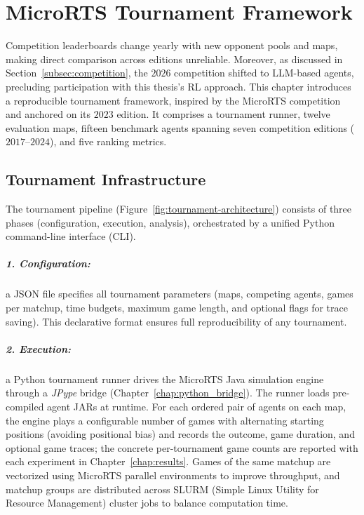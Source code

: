 \chapter{MicroRTS Tournament Framework}
\label{chap:evaluation-framework}

Competition leaderboards change yearly with new opponent pools and maps, making direct comparison across editions unreliable. Moreover, as discussed in Section~\ref{subsec:competition}, the $2026$ competition shifted to LLM-based agents, precluding participation with this thesis's RL approach. This chapter introduces a reproducible tournament framework, inspired by the MicroRTS competition and anchored on its $2023$ edition. It comprises a tournament runner, twelve evaluation maps, fifteen benchmark agents spanning seven competition editions ($2017$--$2024$), and five ranking metrics.

\section{Tournament Infrastructure}
\label{sec:tournament-infrastructure}

The tournament pipeline (Figure~\ref{fig:tournament-architecture}) consists of three phases (configuration, execution, analysis), orchestrated by a unified Python command-line interface (CLI).

\paragraph*{1. Configuration:} a JSON file specifies all tournament parameters (maps, competing agents, games per matchup, time budgets, maximum game length, and optional flags for trace saving). This declarative format ensures full reproducibility of any tournament.

\paragraph*{2. Execution:} a Python tournament runner drives the MicroRTS Java simulation engine through a \emph{JPype} bridge (Chapter~\ref{chap:python_bridge}). The runner loads pre-compiled agent JARs at runtime. For each ordered pair of agents on each map, the engine plays a configurable number of games with alternating starting positions (avoiding positional bias) and records the outcome, game duration, and optional game traces; the concrete per-tournament game counts are reported with each experiment in Chapter~\ref{chap:results}. Games of the same matchup are vectorized using MicroRTS parallel environments to improve throughput, and matchup groups are distributed across SLURM (Simple Linux Utility for Resource Management) cluster jobs to balance computation time.


